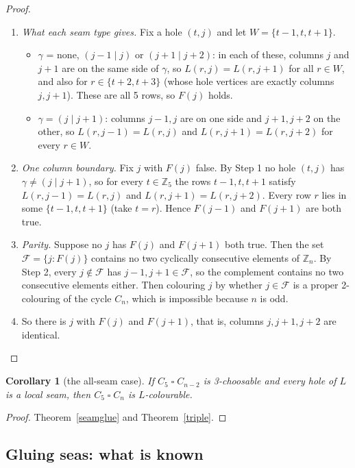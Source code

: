 \documentclass[11pt]{article}
\theoremstyle{plain}
\newtheorem{corollary}[theorem]{Corollary}
\theoremstyle{definition}
\theoremstyle{remark}
\newcommand{\T}{\mathbin{\square}}
\newcommand{\Z}{\mathbb{Z}}
\newenvironment{steps}[1][]{\begin{enumerate}[label=\textbf{Step \arabic*.},leftmargin=4.4em,itemsep=0.35em,#1]}{\end{enumerate}}
\begin{document}
\begin{proof}
\begin{steps}
\item \emph{What each seam type gives.} Fix a hole $(t, j)$ and let $W = \{t-1, t, t+1\}$.
\begin{itemize}[nosep]
\item $\gamma$ = none, $(j{-}1 \mid j)$ or $(j{+}1 \mid j{+}2)$: in each of these, columns $j$ and $j+1$ are on the same side of
$\gamma$, so $L(r, j) = L(r, j+1)$ for all $r \in W$, and also for $r \in \{t+2, t+3\}$ (whose hole vertices are exactly columns
$j, j+1$). These are all 5 rows, so $F(j)$ holds.
\item $\gamma = (j \mid j{+}1)$: columns $j-1, j$ are on one side and $j+1, j+2$ on the other, so
$L(r, j-1) = L(r, j)$ and $L(r, j+1) = L(r, j+2)$ for every $r \in W$.
\end{itemize}
\item \emph{One column boundary.} Fix $j$ with $F(j)$ false. By Step 1 no hole $(t, j)$ has $\gamma \ne (j \mid j{+}1)$, so for
every $t \in \Z_5$ the rows $t - 1, t, t + 1$ satisfy $L(r, j-1) = L(r, j)$ and $L(r, j+1) = L(r, j+2)$. Every row $r$ lies in some
$\{t-1, t, t+1\}$ (take $t = r$). Hence $F(j - 1)$ and $F(j + 1)$ are both true.
\item \emph{Parity.} Suppose no $j$ has $F(j)$ and $F(j+1)$ both true. Then the set $\mathcal{F} = \{j : F(j)\}$ contains no two
cyclically consecutive elements of $\Z_n$. By Step 2, every $j \notin \mathcal{F}$ has $j - 1, j + 1 \in \mathcal{F}$, so the
complement contains no two consecutive elements either. Then colouring $j$ by whether $j \in \mathcal{F}$ is a proper
2-colouring of the cycle $C_n$, which is impossible because $n$ is odd.
\item So there is $j$ with $F(j)$ and $F(j+1)$, that is, columns $j, j+1, j+2$ are identical. \qedhere
\end{steps}
\end{proof}

\begin{corollary}[the all-seam case]\label{allseam}
If $C_5 \T C_{n-2}$ is 3-choosable and every hole of $L$ is a local seam, then $C_5 \T C_n$ is $L$-colourable.
\end{corollary}

\begin{proof}
Theorem~\ref{seamglue} and Theorem~\ref{triple}.
\end{proof}

\subsection{Gluing seas: what is known}
\end{document}
